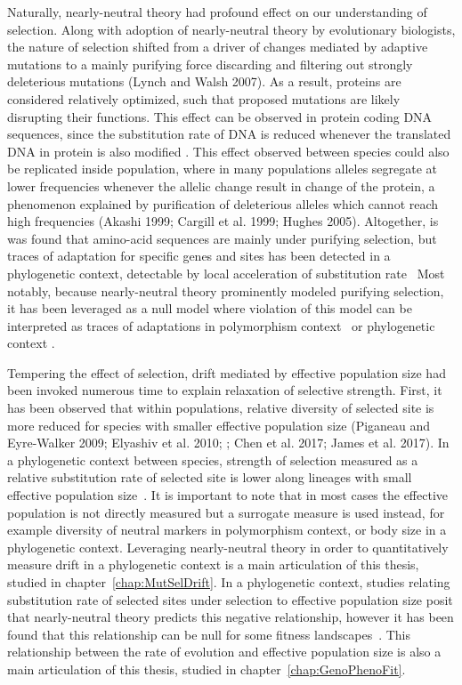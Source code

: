 Naturally, nearly-neutral theory had profound effect on our understanding of selection. 
Along with adoption of nearly-neutral theory by evolutionary biologists, the nature of selection shifted from a driver of changes mediated by adaptive mutations to a mainly purifying force discarding and filtering out strongly deleterious mutations (Lynch and Walsh 2007).
As a result, proteins are considered relatively optimized, such that proposed mutations are likely disrupting their functions.
This effect can be observed in protein coding DNA sequences, since the substitution rate of DNA is reduced whenever the translated DNA in protein is also modified \cite{Muse1994,Goldman1994}.
This effect observed between species could also be replicated inside population, where in many populations alleles segregate at lower frequencies whenever the allelic change result in change of the protein, a phenomenon explained by purification of deleterious alleles which cannot reach high frequencies (Akashi 1999; Cargill et al. 1999; Hughes 2005).
Altogether, is was found that amino-acid sequences are mainly under purifying selection, but traces of adaptation for specific genes and sites has been detected in a phylogenetic context, detectable by local acceleration of substitution rate~\citep{enard_viruses_2016}
Most notably, because nearly-neutral theory prominently modeled purifying selection, it has been leveraged as a null model where violation of this model can be interpreted as traces of adaptations in polymorphism context~\citep{McDonald1991, Galtier2016} or phylogenetic context \cite{Rodrigue2016}.

Tempering the effect of selection, drift mediated by effective population size had been invoked numerous time to explain relaxation of selective strength.
First, it has been observed that within populations, relative diversity of selected site is more reduced for species with smaller effective population size (Piganeau and Eyre-Walker 2009; Elyashiv et al. 2010; \citep{Galtier2016}; Chen et al. 2017; James et al. 2017).
In a phylogenetic context between species, strength of selection measured as a relative substitution rate of selected site is lower along lineages with small effective population size~\citep{Popadin2007}.
It is important to note that in most cases the effective population is not directly measured but a surrogate measure is used instead, for example diversity of neutral markers in polymorphism context, or body size in a phylogenetic context.
Leveraging nearly-neutral theory in order to quantitatively measure drift in a phylogenetic context is a main articulation of this thesis, studied in chapter~\ref{chap:MutSelDrift}.
In a phylogenetic context, studies relating substitution rate of selected sites under selection to effective population size posit that nearly-neutral theory predicts this negative relationship, however it has been found that this relationship can be null for some fitness landscapes~\citep{Cherry1998, Goldstein2013}.
This relationship between the rate of evolution and effective population size is also a main articulation of this thesis, studied in chapter~\ref{chap:GenoPhenoFit}.

